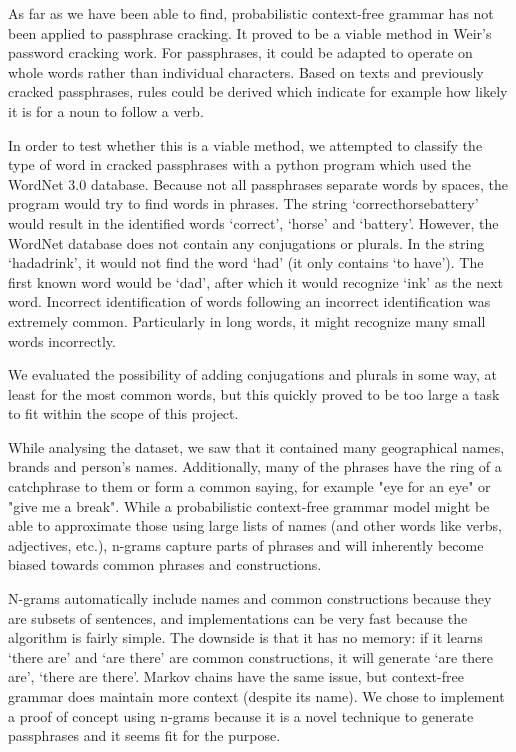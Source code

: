 \documentclass{article}
\begin{document}
As far as we have been able to find, probabilistic context-free grammar has not
been applied to passphrase cracking. It proved to be a viable method in
Weir's\cite{weir} password cracking work. For passphrases, it could be adapted
to operate on whole words rather than individual characters. Based on texts and
previously cracked passphrases, rules could be derived which indicate for
example how likely it is for a noun to follow a verb.

In order to test whether this is a viable method, we attempted to classify the
type of word in cracked passphrases with a python program which used the
WordNet 3.0 database\cite{wordnet}. Because not all passphrases separate words
by spaces, the program would try to find words in phrases. The string
`correcthorsebattery' would result in the identified words `correct', `horse'
and `battery'. However, the WordNet database does not contain any conjugations
or plurals. In the string `hadadrink', it would not find the word `had' (it
only contains `to have'). The first known word would be `dad', after which it
would recognize `ink' as the next word. Incorrect identification of words
following an incorrect identification was extremely common. Particularly in
long words, it might recognize many small words incorrectly.

We evaluated the possibility of adding conjugations and plurals in some way, at
least for the most common words, but this quickly proved to be too large a task
to fit within the scope of this project.

While analysing the dataset, we saw that it contained many geographical names,
brands and person's names. Additionally, many of the phrases have the ring of a
catchphrase to them or form a common saying, for example "eye for an eye" or
"give me a break". While a probabilistic context-free grammar model might be
able to approximate those using large lists of names (and other words like
verbs, adjectives, etc.), n-grams capture parts of phrases and will inherently
become biased towards common phrases and constructions.

N-grams automatically include names and common constructions because they are
subsets of sentences, and implementations can be very fast because the
algorithm is fairly simple. The downside is that it has no memory: if it learns
`there are' and `are there' are common constructions, it will generate `are
there are', `there are there'. Markov chains have the same issue, but
context-free grammar does maintain more context (despite its name). We
chose to implement a proof of concept using n-grams because it is a novel
technique to generate passphrases and it seems fit for the purpose.
\end{document}
